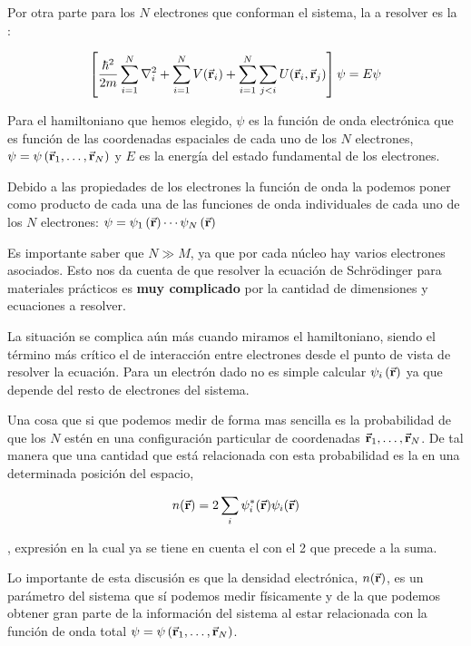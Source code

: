 Por otra parte para los $N$ electrones que conforman el sistema, la  a resolver es la : 

\begin{equation}
    \left[ \frac{\hbar^2}{2m} \sum_{i=1}^{N} \laplacian_i + \sum_{i=1}^{N} V(\va{r}_i) + \sum_{i=1}^{N} \sum_{j<i} U(\va{r}_i , \va{r}_j) \right] \psi = E \psi
\end{equation}

Para el hamiltoniano que hemos elegido, $\psi$ es la función de onda electrónica que es función de las coordenadas espaciales de cada uno de los $N$ electrones, $\psi = \psi \left( \va{r}_{1} , \dots , \va{r}_{N} \right)$  y $E$ es la energía del estado fundamental de los electrones.

Debido a las propiedades de los electrones la función de onda la podemos poner como producto de cada una de las funciones de onda individuales de cada uno de los $N$ electrones: $\psi = \psi_{1} \left( \va{r} \right) \cdots \psi_{N} \left( \va{r} \right)$ 

Es importante saber que $N \gg M$, ya que por cada núcleo hay varios electrones asociados. Esto nos da cuenta de que resolver la ecuación de Schrödinger para materiales prácticos es \textbf{muy complicado} por la cantidad de dimensiones y ecuaciones a resolver. 

La situación se complica aún más cuando miramos el hamiltoniano, siendo el término más crítico el de interacción entre electrones desde el punto de vista de resolver la ecuación. Para un electrón dado no es simple calcular $\psi_{i} \left( \va{r} \right)$ ya que depende del resto de electrones del sistema.

Una cosa que si que podemos medir de forma mas sencilla es la probabilidad de que los $N$ estén en una configuración particular de coordenadas $\va{r}_{1} , \dots , \va{r}_{N}$. De tal manera que una cantidad que está relacionada con esta probabilidad es la  en una determinada posición del espacio, 

\begin{equation}
    n(\va{r}) = 2 \sum_i \psi^*_i (\va{r}) \psi_i (\va{r})
\end{equation}

, expresión en la cual ya se tiene en cuenta el  con el 2 que precede a la suma.

Lo importante de esta discusión es que la densidad electrónica, $n(\va{r})$, es un parámetro del sistema que sí podemos medir físicamente y de la que podemos obtener gran parte de la información del sistema al estar relacionada con la función de onda total  $\psi = \psi \left( \va{r}_{1} , \dots , \va{r}_{N} \right)$.